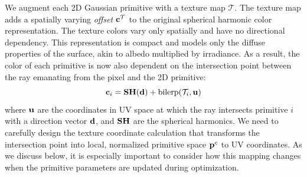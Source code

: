 We augment each 2D Gaussian primitive with a texture map 
$\mathcal{T}$.
The texture map adds a spatially varying \emph{offset} $\mathbf{c}^\mathcal{T}$ to the original spherical harmonic color representation. 
The texture colors vary only spatially and have no directional dependency. This representation is compact and models only the diffuse properties of the surface, akin to albedo multiplied by irradiance. 
As a result, the color of each primitive is now also dependent on the intersection point between the ray emanating from the pixel and the 2D primitive:
\begin{equation}
    \mathbf{c}_i = \mathbf{SH}(\mathbf{d}) + \text{bilerp}(\mathcal{T}_i, \mathbf{u})
\end{equation}
where $\mathbf{u}$ are the coordinates in UV space at which the ray intersects primitive $i$ with a direction vector $\mathbf{d}$, and $\mathbf{SH}$ are the spherical harmonics.
We need to carefully design the texture coordinate calculation
that transforms the intersection point into local, normalized primitive space $\mathbf{p}^c$ to UV coordinates. 
As we discuss below, it is especially important to consider how this mapping changes when the primitive parameters are updated during optimization.

